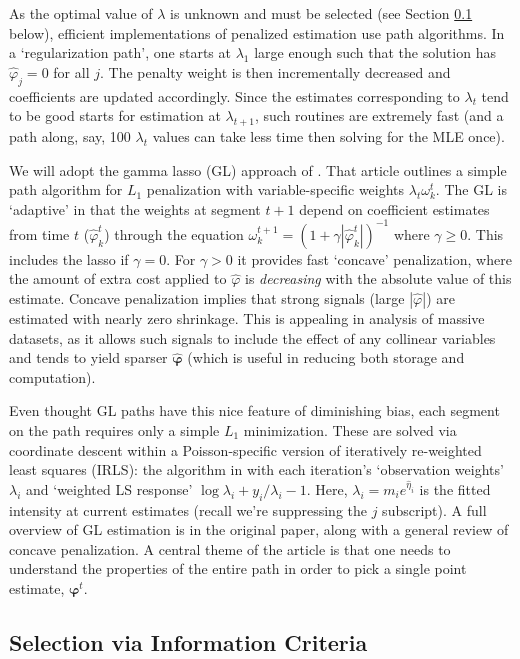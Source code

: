 \documentclass[12pt]{article}
\newcommand{\bs}[1]{\boldsymbol{#1}}
\begin{document}
As the optimal value of $\lambda$ is unknown and must be selected (see Section
\ref{IC} below), efficient implementations of penalized estimation use path
algorithms.  In a `regularization path', one starts at $\lambda_1$ large
enough such that the solution has $\hat\varphi_j=0$ for all $j$.  The penalty
weight is then incrementally decreased and coefficients are updated
accordingly. Since the estimates corresponding to $\lambda_t$ tend to be good
starts for estimation at $\lambda_{t+1}$, such routines are extremely fast
(and a path along, say, 100 $\lambda_t$ values can take less time then solving
for the MLE once).

We will adopt the gamma lasso (GL) approach of
\citet{taddy_gamma_2013}.  That article outlines a simple path
algorithm for $L_1$ penalization with  variable-specific weights $\lambda_t
\omega^t_{k}$.  The GL is `adaptive' in that the  weights at segment
$t+1$ depend on coefficient estimates from time $t$ ($\hat \varphi^t_k$)
through the equation $\omega^{t+1}_k  = \left(1 + \gamma
|\hat\varphi^t_k|\right)^{-1}$ where $\gamma \geq 0$.  This includes the
 lasso if $\gamma=0$.  For $\gamma>0$ it provides fast
`concave' penalization, where  the amount of extra cost applied to
$\hat \varphi$ is {\it decreasing} with the absolute value of this estimate.
Concave penalization implies that strong signals (large $|\hat
\varphi|$) are estimated with nearly zero shrinkage. This is appealing in
analysis of massive datasets, as it allows such signals to include the
effect of any collinear variables and tends to yield sparser $\bs{\hat
\varphi}$ (which is useful in reducing both storage and computation).

Even thought GL paths have this nice feature of diminishing bias, each segment
on the path requires only a simple $L_1$ minimization.  These are solved via
coordinate descent within a Poisson-specific version of iteratively re-weighted least squares (IRLS): the
algorithm in \citet[Section 6]{taddy_gamma_2013} with each iteration's
`observation weights' $\lambda_i$ and `weighted LS response' $\log\lambda_i +
y_i/\lambda_i - 1$.  Here, $\lambda_i = m_ie^{\hat\eta_i}$ is the fitted
intensity at current estimates (recall we're suppressing the $j$  subscript).
A full overview of GL estimation is in the original paper, along with a
general review of concave penalization.  A central theme of the article is
that  one needs to understand the properties of the entire path in order to
pick a single point estimate, $\bs{\varphi}^t$.


\subsection{Selection via Information Criteria}
\label{IC}
\end{document}
